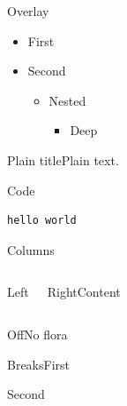 \documentclass[aspectratio=169]{beamer}
\begin{document}
\begin{frame}{Overlay}
\begin{itemize}\item First\pause\item Second\begin{itemize}\item Nested\begin{itemize}\item Deep\end{itemize}\end{itemize}\end{itemize}
\end{frame}
\begin{frame}[plain]{Plain title}Plain text.\end{frame}
\begin{frame}[fragile]{Code}
\begin{verbatim}
hello world
\end{verbatim}
\end{frame}
\begin{frame}{Columns}\begin{columns}Left\begin{block}{Right}Content\end{block}\end{columns}\end{frame}
\floraoff
\begin{frame}{Off}No flora\end{frame}
\floraon
{}
\begin{frame}[allowframebreaks]{Breaks}First\par\framebreak Second\end{frame}
\end{document}
